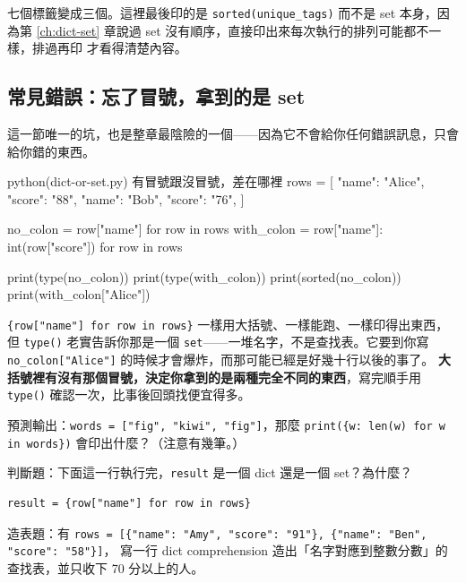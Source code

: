 七個標籤變成三個。這裡最後印的是 \texttt{sorted(unique\_tags)} 而不是 set 本身，因為第
\ref{ch:dict-set} 章說過 set 沒有順序，直接印出來每次執行的排列可能都不一樣，排過再印
才看得清楚內容。

\subsection*{常見錯誤：忘了冒號，拿到的是 set}

這一節唯一的坑，也是整章最陰險的一個——因為它不會給你任何錯誤訊息，只會給你錯的東西。

\begin{example}{python}{(dict-or-set.py) 有冒號跟沒冒號，差在哪裡}
rows = [
    {"name": "Alice", "score": "88"},
    {"name": "Bob", "score": "76"},
]

no_colon = {row["name"] for row in rows}
with_colon = {row["name"]: int(row["score"]) for row in rows}

print(type(no_colon))
print(type(with_colon))
print(sorted(no_colon))
print(with_colon["Alice"])
\end{example}


\texttt{\{row["name"] for row in rows\}} 一樣用大括號、一樣能跑、一樣印得出東西，但
\texttt{type()} 老實告訴你那是一個 \texttt{set}——一堆名字，不是查找表。它要到你寫
\texttt{no\_colon["Alice"]} 的時候才會爆炸，而那可能已經是好幾十行以後的事了。
\textbf{大括號裡有沒有那個冒號，決定你拿到的是兩種完全不同的東西}，寫完順手用
\texttt{type()} 確認一次，比事後回頭找便宜得多。

\begin{drills}[label=drills:comp-dict-set]
\item 預測輸出：\texttt{words = ["fig", "kiwi", "fig"]}，那麼
\texttt{print(\{w: len(w) for w in words\})} 會印出什麼？（注意有幾筆。）
\item 判斷題：下面這一行執行完，\texttt{result} 是一個 dict 還是一個 set？為什麼？
\begin{verbatim}
result = {row["name"] for row in rows}
\end{verbatim}
\item 造表題：有
\texttt{rows = [\{"name": "Amy", "score": "91"\}, \{"name": "Ben", "score": "58"\}]}，
寫一行 dict comprehension 造出「名字對應到整數分數」的查找表，並只收下 70 分以上的人。
\end{drills}

